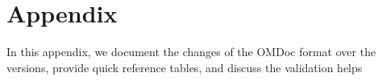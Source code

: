 
\part{Appendix}\label{part:appendix}
  In this appendix, we document the changes of the OMDoc format over the versions,
  provide quick reference tables, and discuss the validation helps

